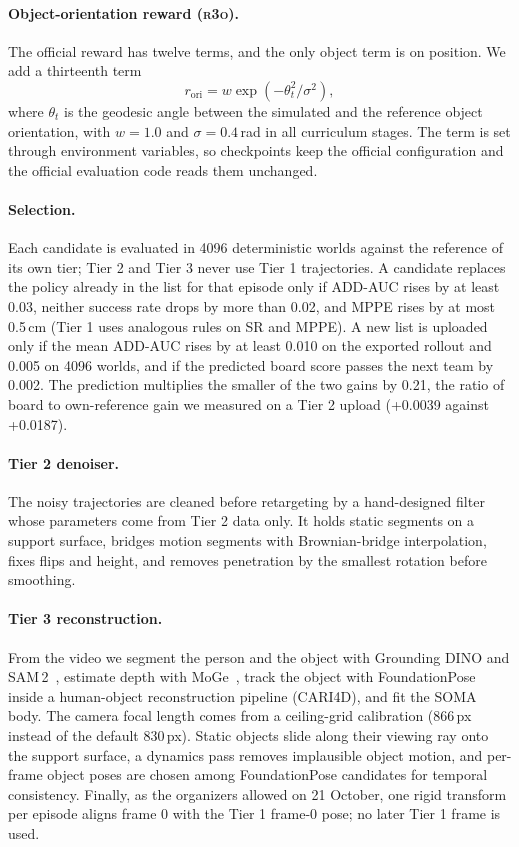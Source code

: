 \documentclass[10pt]{nvidiaextabstract}
\newcommand{\rtho}{\textsc{r3o}\xspace}
\begin{document}
\paragraph{Object-orientation reward (\rtho).}
The official reward has twelve terms, and the only object term is on position.
We add a thirteenth term
\begin{equation}
\label{eq:ori}
r_{\mathrm{ori}} = w \exp\!\left(-\theta_t^2 / \sigma^2\right),
\end{equation}
where $\theta_t$ is the geodesic angle between the simulated and the reference object orientation, with $w=1.0$ and $\sigma=0.4$\,rad in all curriculum stages.
The term is set through environment variables, so checkpoints keep the official configuration and the official evaluation code reads them unchanged.

\paragraph{Selection.}
Each candidate is evaluated in 4096 deterministic worlds against the reference of its own tier; Tier 2 and Tier 3 never use Tier 1 trajectories.
A candidate replaces the policy already in the list for that episode only if ADD-AUC rises by at least 0.03, neither success rate drops by more than 0.02, and MPPE rises by at most 0.5\,cm (Tier 1 uses analogous rules on SR and MPPE).
A new list is uploaded only if the mean ADD-AUC rises by at least 0.010 on the exported rollout and 0.005 on 4096 worlds, and if the predicted board score passes the next team by 0.002.
The prediction multiplies the smaller of the two gains by 0.21, the ratio of board to own-reference gain we measured on a Tier 2 upload (+0.0039 against +0.0187).

\paragraph{Tier 2 denoiser.}
The noisy trajectories are cleaned before retargeting by a hand-designed filter whose parameters come from Tier 2 data only.
It holds static segments on a support surface, bridges motion segments with Brownian-bridge interpolation, fixes flips and height, and removes penetration by the smallest rotation before smoothing.

\paragraph{Tier 3 reconstruction.}
From the video we segment the person and the object with Grounding DINO and SAM\,2~\cite{liu2024groundingdino,ravi2024sam2}, estimate depth with MoGe~\cite{wang2025moge}, track the object with FoundationPose~\cite{wen2024foundationpose} inside a human-object reconstruction pipeline (CARI4D), and fit the SOMA body.
The camera focal length comes from a ceiling-grid calibration (866\,px instead of the default 830\,px).
Static objects slide along their viewing ray onto the support surface, a dynamics pass removes implausible object motion, and per-frame object poses are chosen among FoundationPose candidates for temporal consistency.
Finally, as the organizers allowed on 21 October, one rigid transform per episode aligns frame 0 with the Tier 1 frame-0 pose; no later Tier 1 frame is used.
\end{document}
